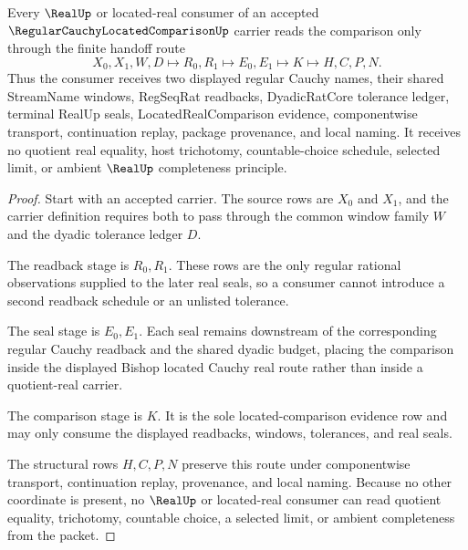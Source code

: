 \begin{theorem}
\label{thm:regular-cauchy-located-comparison-real-handoff}
Every $\RealUp$ or located-real consumer of an accepted $\RegularCauchyLocatedComparisonUp$ carrier reads the comparison only through the finite handoff route
$$
X_0,X_1,W,D \longmapsto R_0,R_1 \longmapsto E_0,E_1 \longmapsto K \longmapsto H,C,P,N .
$$
Thus the consumer receives two displayed regular Cauchy names, their shared StreamName windows, RegSeqRat readbacks, DyadicRatCore tolerance ledger, terminal RealUp seals, LocatedRealComparison evidence, componentwise transport, continuation replay, package provenance, and local naming. It receives no quotient real equality, host trichotomy, countable-choice schedule, selected limit, or ambient $\RealUp$ completeness principle.
\end{theorem}
\begin{proof}
Start with an accepted carrier. The source rows are $X_0$ and $X_1$, and the carrier definition requires both to pass through the common window family $W$ and the dyadic tolerance ledger $D$.

The readback stage is $R_0,R_1$. These rows are the only regular rational observations supplied to the later real seals, so a consumer cannot introduce a second readback schedule or an unlisted tolerance.

The seal stage is $E_0,E_1$. Each seal remains downstream of the corresponding regular Cauchy readback and the shared dyadic budget, placing the comparison inside the displayed Bishop located Cauchy real route rather than inside a quotient-real carrier.

The comparison stage is $K$. It is the sole located-comparison evidence row and may only consume the displayed readbacks, windows, tolerances, and real seals.

The structural rows $H,C,P,N$ preserve this route under componentwise transport, continuation replay, provenance, and local naming. Because no other coordinate is present, no $\RealUp$ or located-real consumer can read quotient equality, trichotomy, countable choice, a selected limit, or ambient completeness from the packet.
\end{proof}



